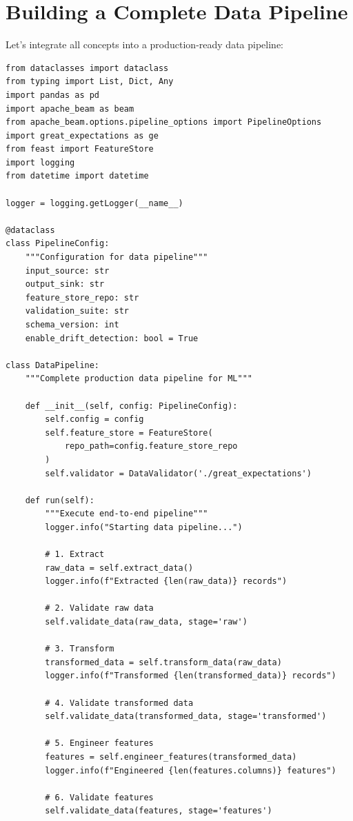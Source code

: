 \section{Building a Complete Data Pipeline}

Let's integrate all concepts into a production-ready data pipeline:

\begin{lstlisting}[style=python, caption=Complete production data pipeline]
from dataclasses import dataclass
from typing import List, Dict, Any
import pandas as pd
import apache_beam as beam
from apache_beam.options.pipeline_options import PipelineOptions
import great_expectations as ge
from feast import FeatureStore
import logging
from datetime import datetime

logger = logging.getLogger(__name__)

@dataclass
class PipelineConfig:
    """Configuration for data pipeline"""
    input_source: str
    output_sink: str
    feature_store_repo: str
    validation_suite: str
    schema_version: int
    enable_drift_detection: bool = True

class DataPipeline:
    """Complete production data pipeline for ML"""

    def __init__(self, config: PipelineConfig):
        self.config = config
        self.feature_store = FeatureStore(
            repo_path=config.feature_store_repo
        )
        self.validator = DataValidator('./great_expectations')

    def run(self):
        """Execute end-to-end pipeline"""
        logger.info("Starting data pipeline...")

        # 1. Extract
        raw_data = self.extract_data()
        logger.info(f"Extracted {len(raw_data)} records")

        # 2. Validate raw data
        self.validate_data(raw_data, stage='raw')

        # 3. Transform
        transformed_data = self.transform_data(raw_data)
        logger.info(f"Transformed {len(transformed_data)} records")

        # 4. Validate transformed data
        self.validate_data(transformed_data, stage='transformed')

        # 5. Engineer features
        features = self.engineer_features(transformed_data)
        logger.info(f"Engineered {len(features.columns)} features")

        # 6. Validate features
        self.validate_data(features, stage='features')


\end{lstlisting}
